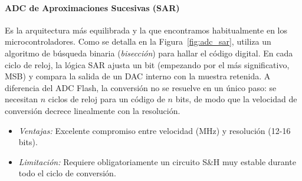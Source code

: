 \paragraph{ADC de Aproximaciones Sucesivas (SAR)}
Es la arquitectura más equilibrada y la que encontramos habitualmente en los microcontroladores. Como se detalla en la Figura~\ref{fig:adc_sar}, utiliza un algoritmo de búsqueda binaria (\textit{bisección}) para hallar el código digital. En cada ciclo de reloj, la lógica SAR ajusta un bit (empezando por el más significativo, MSB) y compara la salida de un DAC interno con la muestra retenida. A diferencia del ADC Flash, la conversión no se resuelve en un único paso: se necesitan $n$ ciclos de reloj para un código de $n$ bits, de modo que la velocidad de conversión decrece linealmente con la resolución.
\begin{itemize}
    \item \emph{Ventajas:} Excelente compromiso entre velocidad (\unit{MHz}) y resolución (12-16 bits).
    \item \emph{Limitación:} Requiere obligatoriamente un circuito S\&H muy estable durante todo el ciclo de conversión.
\end{itemize}

\begin{marginfigure}
    \centering
    \shorthandoff{>}
    \caption[Arquitectura ADC SAR.]{Arquitectura SAR. Un algoritmo de búsqueda binaria ajusta el DAC interno bit a bit hasta aproximarse a la tensión de entrada.}\label{fig:adc_sar}
\end{marginfigure}

